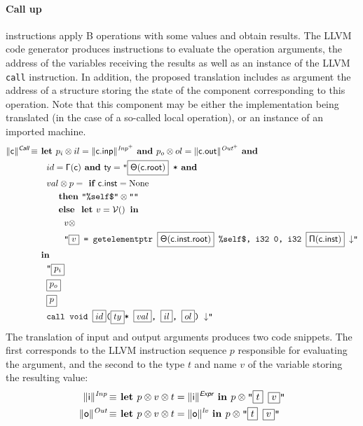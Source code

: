 \documentclass{llncs}
\newcommand{\trad}[2]{\ensuremath{\lVert \textsf{#1} \rVert^{\textit{#2}}}}
\newcommand{\nl}[0]{\ensuremath{\downarrow}}
\DeclareMathOperator{\isdef}{\equiv}
\DeclareMathOperator{\variable}{\mathcal{V}()}
\newcommand{\llvm}[1]{\texttt{#1}}
\newcommand{\B}[1]{\textsf{#1}}
\newcommand{\ListOf}[1]{$\mbox{#1}^+$}
\newcommand{\IF}[0]{\textbf{ if }}
\newcommand{\ELSE}[0]{\textbf{ else }}
\newcommand{\THEN}[0]{\textbf{ then }}
\newcommand{\LET}[0]{\textbf{ let }}
\newcommand{\IN}[0]{\textbf{ in }}
\newcommand{\AND}[0]{\textbf{ and }}
\newcommand{\PH}[1]{\framebox{$#1$}}
\newcommand{\sep}[0]{\otimes}
\newcommand{\Global}[0]{\ensuremath{\sf\Gamma}}
\newcommand{\idx}[0]{\ensuremath{\sf\Pi}}
\newcommand{\state}[0]{\ensuremath{\sf\Theta}}
\begin{document}
\begin{enumerate}
\paragraph{Call up} instructions apply B operations with some values and obtain
results. The LLVM code generator produces instructions to evaluate the operation
arguments, the address of the variables receiving the results as well as an
instance of the LLVM \llvm{call} instruction. In addition, the proposed
translation includes as argument the address of a structure storing the state of
the component corresponding to this operation. Note that this component may be
either the implementation being translated (in the case of a so-called local
operation), or an instance of an imported machine.
\begin{align*}
  \trad{c}{\B{Call}} \isdef 
  & \LET p_i \sep il = \trad{c.inp}{\ListOf{Inp}} \AND p_o \sep ol = 
  \trad{c.out}{\ListOf{Out}} \AND \\
  & \quad id = \Global(\B{c}) \AND ty = \llvm{"\PH{\state(\B{c.root})} *} \AND \\
  & \quad val \sep p = \IF \B{c.inst} = \text{None} \\
  & \quad \quad \THEN \llvm{"\%self\$"} \sep \llvm{""} \\
  & \quad \quad \ELSE \LET v = \variable \IN \\
  & \quad \quad \quad v \sep \\
  & \quad \quad \quad \llvm{"\PH{v} = getelementptr \PH{ \state({\B{c.inst.root}})} \%self\$, i32 0, i32 \PH{\idx(\B{c.inst})} \nl"} \\
  & \IN \\
  & \quad \llvm{"\PH{p_i}} \\
  & \quad \llvm{\PH{p_o}} \\
  & \quad \llvm{\PH{p}} \\
  & \quad \llvm{call void \PH{id}(\PH{ty}* \PH{val}, \PH{il}, \PH{ol}) \nl"}
\end{align*}
The translation of input and output arguments produces two code snippets. The
first corresponds to the LLVM instruction sequence $p$ responsible for
evaluating the argument, and the second to the type $t$ and name $v$ of the
variable storing the resulting value:
\begin{align*}
  \trad{i}{Inp} \isdef 
  & \LET p \sep v \sep t = \trad{i}{\B{Expr}} \IN p \sep \llvm{"\PH{t} \PH{v}"}\\
  \trad{o}{Out} \isdef 
  & \LET p \sep v \sep t = \trad{o}{lv} \IN p \sep \llvm{"\PH{t} \PH{v}"}
\end{align*}


\end{enumerate}
\end{document}
